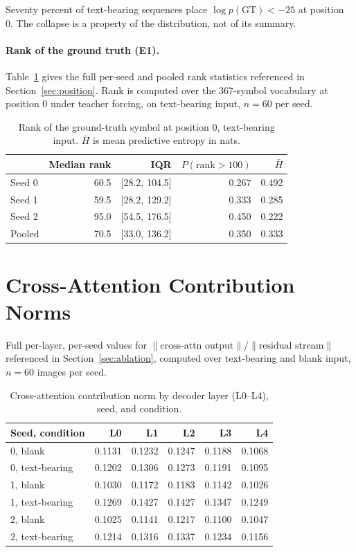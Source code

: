\documentclass{article}
\begin{document}
Seventy percent of text-bearing sequences place $\log p(\mathrm{GT}) < -25$ at position 0. The
collapse is a property of the distribution, not of its summary.

\paragraph{Rank of the ground truth (E1).} Table~\ref{tab:ranke1} gives the full per-seed and
pooled rank statistics referenced in Section~\ref{sec:position}. Rank is computed over the
367-symbol vocabulary at position 0 under teacher forcing, on text-bearing input, $n=60$ per
seed.

\begin{table}[h]
\small
\centering
\caption{Rank of the ground-truth symbol at position 0, text-bearing input. $\bar{H}$ is mean
predictive entropy in nats.}
\label{tab:ranke1}
\begin{tabular}{lrrrr}
\toprule
 & Median rank & IQR & $P(\text{rank}>100)$ & $\bar{H}$ \\
\midrule
Seed 0   & 60.5 & [28.2, 104.5] & 0.267 & 0.492 \\
Seed 1   & 59.5 & [28.2, 129.2] & 0.333 & 0.285 \\
Seed 2   & 95.0 & [54.5, 176.5] & 0.450 & 0.222 \\
Pooled   & 70.5 & [33.0, 136.2] & 0.350 & 0.333 \\
\bottomrule
\end{tabular}
\end{table}

\section{Cross-Attention Contribution Norms}
\label{app:crossattn}

Full per-layer, per-seed values for $\|\text{cross-attn output}\|/\|\text{residual stream}\|$
referenced in Section~\ref{sec:ablation}, computed over text-bearing and blank input, $n=60$
images per seed.

\begin{table}[h]
\small
\centering
\caption{Cross-attention contribution norm by decoder layer (L0--L4), seed, and condition.}
\label{tab:crossattn}
\begin{tabular}{lrrrrr}
\toprule
Seed, condition & L0 & L1 & L2 & L3 & L4 \\
\midrule
0, blank        & 0.1131 & 0.1232 & 0.1247 & 0.1188 & 0.1068 \\
0, text-bearing & 0.1202 & 0.1306 & 0.1273 & 0.1191 & 0.1095 \\
1, blank        & 0.1030 & 0.1172 & 0.1183 & 0.1142 & 0.1026 \\
1, text-bearing & 0.1269 & 0.1427 & 0.1427 & 0.1347 & 0.1249 \\
2, blank        & 0.1025 & 0.1141 & 0.1217 & 0.1100 & 0.1047 \\
2, text-bearing & 0.1214 & 0.1316 & 0.1337 & 0.1234 & 0.1156 \\
\bottomrule
\end{tabular}
\end{table}
\end{document}
